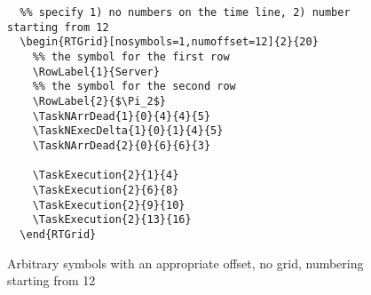 \documentclass{article}
\begin{document}
\begin{figure}[!htbp]
  \centering
  \begin{RTGrid}[nosymbols=1,numoffset=12]{2}{20}
    
  \end{RTGrid}
\begin{verbatim}
  %% specify 1) no numbers on the time line, 2) number starting from 12
  \begin{RTGrid}[nosymbols=1,numoffset=12]{2}{20}
    %% the symbol for the first row
    \RowLabel{1}{Server}
    %% the symbol for the second row
    \RowLabel{2}{$\Pi_2$}
    \TaskNArrDead{1}{0}{4}{4}{5}    
    \TaskNExecDelta{1}{0}{1}{4}{5}  
    \TaskNArrDead{2}{0}{6}{6}{3}
    
    \TaskExecution{2}{1}{4}
    \TaskExecution{2}{6}{8}
    \TaskExecution{2}{9}{10}
    \TaskExecution{2}{13}{16}        
  \end{RTGrid}
\end{verbatim}
  \caption{Arbitrary symbols with an appropriate offset, no grid, numbering starting from 12}
  \label{fig:ex2b}
\end{figure}


    

    
\end{document}

